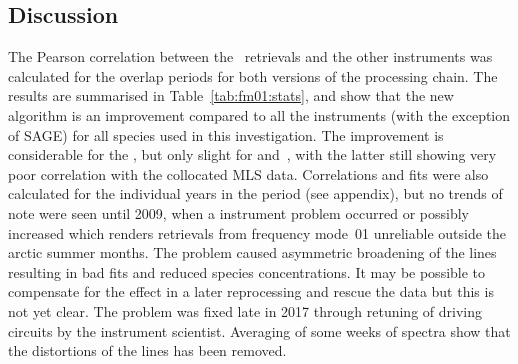 \subsection{Discussion}
\label{sec:fm01:discussion}
The Pearson correlation between the \smr\ retrievals and the other instruments
was calculated for the overlap periods for both versions of the processing chain.
The results are summarised in Table~\ref{tab:fm01:stats}, and show that the
new algorithm is an improvement compared to all the instruments (with the exception of SAGE) for all species
used in this investigation. The improvement is considerable for the ,
but only slight for  and~, with the latter still showing
very poor correlation with the collocated MLS data. Correlations and fits
were also calculated for the individual years in the period (see appendix), but no trends of
note were seen until 2009, when a instrument problem occurred or possibly
increased which renders retrievals from frequency mode~01 unreliable outside
the arctic summer months.  The problem caused asymmetric broadening of the
lines resulting in bad fits and reduced species concentrations. It may be
possible to compensate for the effect in a later reprocessing and rescue the
data but this is not yet clear. The problem was fixed late in 2017 through retuning of driving circuits by the instrument scientist.
Averaging of some weeks of spectra show that the distortions of the lines has been removed.


